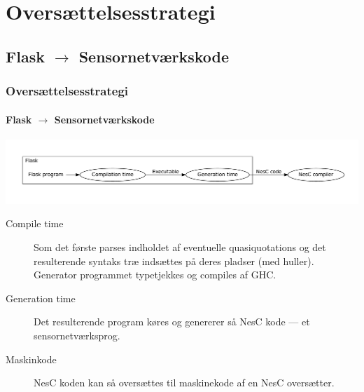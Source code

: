 \documentclass{beamer}
\begin{document}
\section{Oversættelsesstrategi}
\subsection{Flask $\rightarrow$ Sensornetværkskode}
\begin{frame}[t]
  \frametitle{Oversættelsesstrategi} 
  \framesubtitle{Flask $\rightarrow$ Sensornetværkskode}

  \includegraphics[width=\textwidth]{flask-simple}

\begin{description}
  \item[Compile time] Som det første parses indholdet af eventuelle
    quasiquotations og det resulterende syntaks træ indsættes på deres
    pladser (med huller). Generator programmet typetjekkes og
    compiles af GHC.
\item[Generation time] 
  Det resulterende program køres og genererer så NesC kode --- et
  sensornetværksprog.

\item[Maskinkode]
  NesC koden kan så oversættes til maskinekode af en NesC oversætter.   
\end{description}
\end{frame}
\end{document}
